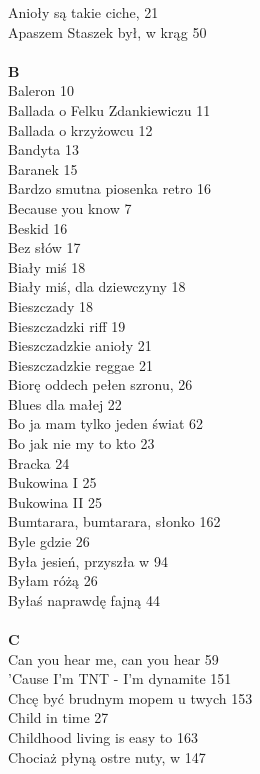\documentclass[a5paper, 10pt]{book}
\begin{document}
{\begin{multicols}{3}
    Anioły są takie ciche, 21\\
    Apaszem Staszek był, w krąg 50\\
    \\
    {\footnotesize \textbf{B\\} }
    Baleron 10\\
    Ballada o Felku Zdankiewiczu 11\\
    Ballada o krzyżowcu 12\\
    Bandyta 13\\
    Baranek 15\\
    Bardzo smutna piosenka retro 16\\
    Because you know 7\\
    Beskid 16\\
    Bez słów 17\\
    Biały miś 18\\
    Biały miś, dla dziewczyny 18\\
    Bieszczady 18\\
    Bieszczadzki riff 19\\
    Bieszczadzkie anioły 21\\
    Bieszczadzkie reggae 21\\
    Biorę oddech pełen szronu, 26\\
    Blues dla małej 22\\
    Bo ja mam tylko jeden świat 62\\
    Bo jak nie my to kto 23\\
    Bracka 24\\
    Bukowina I 25\\
    Bukowina II 25\\
    Bumtarara, bumtarara, słonko 162\\
    Byle gdzie 26\\
    Była jesień, przyszła w 94\\
    Byłam różą 26\\
    Byłaś naprawdę fajną 44\\
    \\
    {\footnotesize \textbf{C\\} }
    Can you hear me, can you hear 59\\
    'Cause I'm TNT - I'm dynamite 151\\
    Chcę być brudnym mopem u twych 153\\
    Child in time 27\\
    Childhood living is easy to 163\\
    Chociaż płyną ostre nuty, w 147\\

\end{multicols}}
\end{document}
